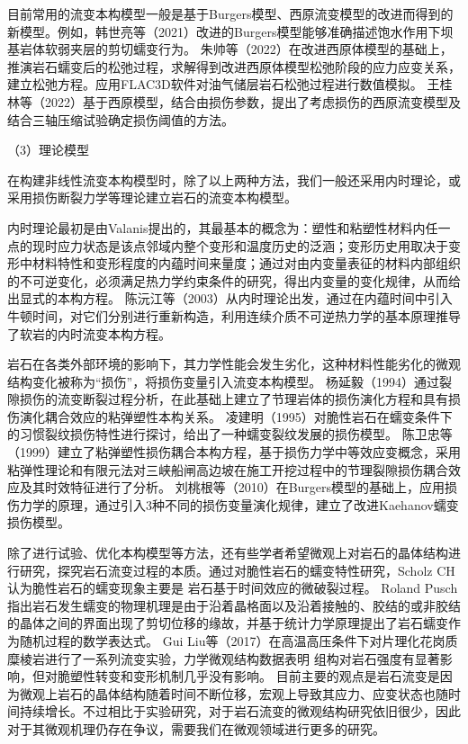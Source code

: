目前常用的流变本构模型一般是基于Burgers模型、西原流变模型的改进而得到的新模型。例如，韩世亮等（2021）改进的Burgers模型能够准确描述饱水作用下坝基岩体软弱夹层的剪切蠕变行为\cite{韩世亮2021}。
朱帅等（2022）在改进西原体模型的基础上，推演岩石蠕变后的松弛过程，求解得到改进西原体模型松弛阶段的应力应变关系，建立松弛方程。应用FLAC3D软件对油气储层岩石松弛过程进行数值模拟\cite{朱帅2022}。
王桂林等（2022）基于西原模型，结合由损伤参数，提出了考虑损伤的西原流变模型及结合三轴压缩试验确定损伤阈值的方法\cite{王桂林2022}。


（3）理论模型

在构建非线性流变本构模型时，除了以上两种方法，我们一般还采用内时理论，或采用损伤断裂力学等理论建立岩石的流变本构模型。

内时理论最初是由Valanis提出的，其最基本的概念为：塑性和粘塑性材料内任一点的现时应力状态是该点邻域内整个变形和温度历史的泛涵；变形历史用取决于变形中材料特性和变形程度的内蕴时间来量度；通过对由内变量表征的材料内部组织的不可逆变化，必须满足热力学约束条件的研究，得出内变量的变化规律，从而给出显式的本构方程。
陈沅江等（2003）从内时理论出发，通过在内蕴时间中引入牛顿时间，对它们分别进行重新构造，利用连续介质不可逆热力学的基本原理推导了软岩的内时流变本构方程\cite{陈沅江2003}。

岩石在各类外部环境的影响下，其力学性能会发生劣化，这种材料性能劣化的微观结构变化被称为“损伤”，将损伤变量引入流变本构模型。
杨延毅（1994）通过裂隙损伤的流变断裂过程分析，在此基础上建立了节理岩体的损伤演化方程和具有损伤演化耦合效应的粘弹塑性本构关系\cite{杨延毅1994}。
凌建明（1995）对脆性岩石在蠕变条件下的习惯裂纹损伤特性进行探讨，给出了一种蠕变裂纹发展的损伤模型\cite{凌建明1995}。
陈卫忠等（1999）建立了粘弹塑性损伤耦合本构方程，基于损伤力学中等效应变概念，采用粘弹性理论和有限元法对三峡船闸高边坡在施工开挖过程中的节理裂隙损伤耦合效应及其时效特征进行了分析\cite{陈卫忠1999}。
刘桃根等（2010）在Burgers模型的基础上，应用损伤力学的原理，通过引入3种不同的损伤变量演化规律，建立了改进Kaehanov蠕变损伤模型\cite{刘桃根2010}。

除了进行试验、优化本构模型等方法，还有些学者希望微观上对岩石的晶体结构进行研究，探究岩石流变过程的本质。通过对脆性岩石的蠕变特性研究，Scholz CH认为脆性岩石的蠕变现象主要是
岩石基于时间效应的微破裂过程\cite{Scholz.C}。
Roland Pusch 指出岩石发生蠕变的物理机理是由于沿着晶格面以及沿着接触的、胶结的或非胶结的晶体之间的界面出现了剪切位移的缘故，并基于统计力学原理提出了岩石蠕变作为随机过程的数学表达式\cite{Roland1988}。
Gui Liu等（2017）在高温高压条件下对片理化花岗质糜棱岩进行了一系列流变实验，力学微观结构数据表明
组构对岩石强度有显著影响，但对脆塑性转变和变形机制几乎没有影响\cite{Liu2017}。
目前主要的观点是岩石流变是因为微观上岩石的晶体结构随着时间不断位移，宏观上导致其应力、应变状态也随时间持续增长。不过相比于实验研究，对于岩石流变的微观结构研究依旧很少，因此对于其微观机理仍存在争议，需要我们在微观领域进行更多的研究。


